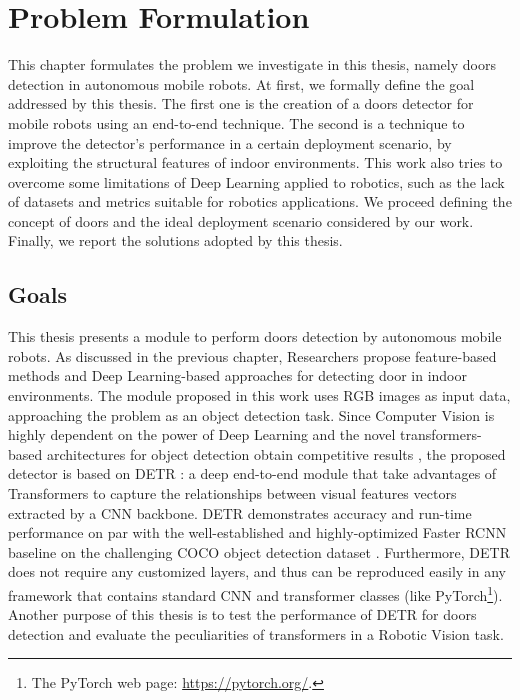 \chapter{Problem Formulation}
\label{sec:chapter3}
\thispagestyle{empty}

This chapter formulates the problem we investigate in this thesis, namely doors detection in autonomous mobile robots.  At first, we formally define the goal addressed by this thesis. The first one is the creation of a doors detector for mobile robots using an end-to-end technique. The second is a technique to improve the detector's performance in a certain deployment scenario, by exploiting the structural features of indoor environments. This work also tries to overcome some limitations of Deep Learning applied to robotics, such as the lack of datasets and metrics suitable for robotics applications. We proceed defining the concept of doors and the ideal deployment scenario considered by our work. Finally, we report the solutions adopted by this thesis.

\section{Goals}
\label{sec:goals}
This thesis presents a module to perform doors detection by autonomous mobile robots. As discussed in the previous chapter, Researchers propose feature-based methods \cite{sonarandivisualdoordetection, humanoid, edgeandcornerdoorsdetector} and Deep Learning-based approaches \cite{detectdoorsfeature, doorsandnavigation, doorcabinet} for detecting door in indoor environments.  The module proposed in this work uses RGB images as input data, approaching the problem as an object detection task. Since Computer Vision is highly dependent on the power of Deep Learning \cite{deeplearningoverview} and the novel transformers-based architectures for object detection obtain competitive results \cite{surveytransformer}, the proposed detector is based on DETR \cite{detr}: a deep end-to-end module that take advantages of Transformers to capture the relationships between visual features vectors extracted by a CNN backbone. DETR demonstrates accuracy and run-time performance on par with the well-established and highly-optimized Faster RCNN \cite{fasterrcnn} baseline on the challenging COCO object detection dataset \cite{coco}. Furthermore, DETR does not require any customized layers, and thus can be reproduced easily in any framework that contains standard CNN and transformer classes (like PyTorch\footnote{The PyTorch web page: \url{https://pytorch.org/}.}). Another purpose of this thesis is to test the performance of DETR for doors detection and evaluate the peculiarities of transformers in a Robotic Vision task.

